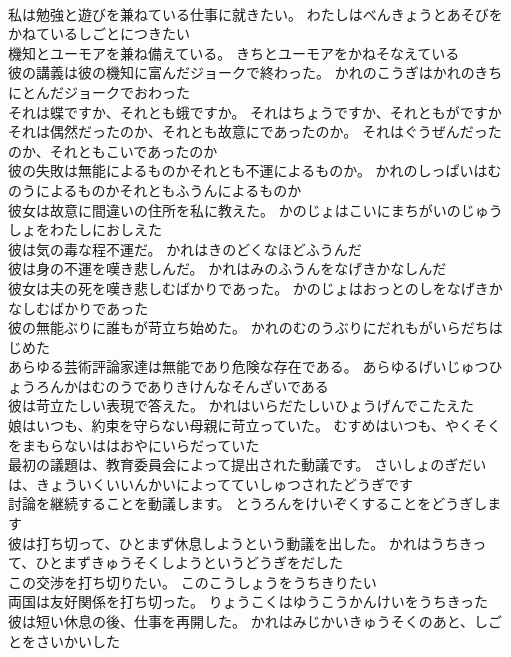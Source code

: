 \documentclass[8pt]{extreport}
\begin{document}
\begin{CJK}{UTF8}{min}
\\	私は勉強と遊びを兼ねている仕事に就きたい。	わたしはべんきょうとあそびをかねているしごとにつきたい 
\\	機知とユーモアを兼ね備えている。	きちとユーモアをかねそなえている 
\\	彼の講義は彼の機知に富んだジョークで終わった。	かれのこうぎはかれのきちにとんだジョークでおわった 
\\	それは蝶ですか、それとも蛾ですか。	それはちょうですか、それともがですか 
\\	それは偶然だったのか、それとも故意にであったのか。	それはぐうぜんだったのか、それともこいであったのか 
\\	彼の失敗は無能によるものかそれとも不運によるものか。	かれのしっぱいはむのうによるものかそれともふうんによるものか 
\\	彼女は故意に間違いの住所を私に教えた。	かのじょはこいにまちがいのじゅうしょをわたしにおしえた 
\\	彼は気の毒な程不運だ。	かれはきのどくなほどふうんだ 
\\	彼は身の不運を嘆き悲しんだ。	かれはみのふうんをなげきかなしんだ 
\\	彼女は夫の死を嘆き悲しむばかりであった。	かのじょはおっとのしをなげきかなしむばかりであった 
\\	彼の無能ぶりに誰もが苛立ち始めた。	かれのむのうぶりにだれもがいらだちはじめた 
\\	あらゆる芸術評論家達は無能であり危険な存在である。	あらゆるげいじゅつひょうろんかはむのうでありきけんなそんざいである 
\\	彼は苛立たしい表現で答えた。	かれはいらだたしいひょうげんでこたえた 
\\	娘はいつも、約束を守らない母親に苛立っていた。	むすめはいつも、やくそくをまもらないははおやにいらだっていた 
\\	最初の議題は、教育委員会によって提出された動議です。	さいしょのぎだいは、きょういくいいんかいによってていしゅつされたどうぎです 
\\	討論を継続することを動議します。	とうろんをけいぞくすることをどうぎします 
\\	彼は打ち切って、ひとまず休息しようという動議を出した。	かれはうちきって、ひとまずきゅうそくしようというどうぎをだした 
\\	この交渉を打ち切りたい。	このこうしょうをうちきりたい 
\\	両国は友好関係を打ち切った。	りょうこくはゆうこうかんけいをうちきった 
\\	彼は短い休息の後、仕事を再開した。	かれはみじかいきゅうそくのあと、しごとをさいかいした 

\end{CJK}
\end{document}

